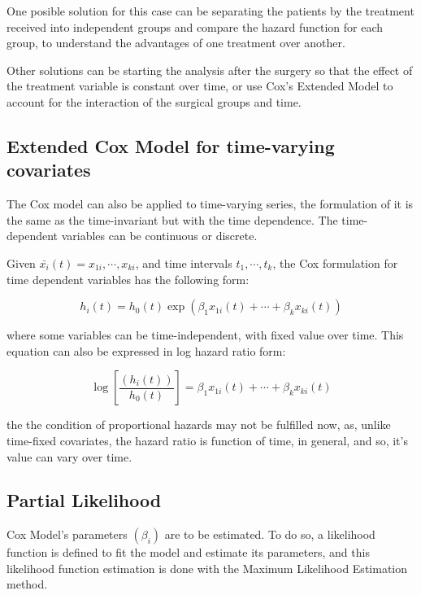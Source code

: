 \documentclass[11pt]{book} %
\begin{document}
      One posible solution for this case can be separating the patients by the treatment received into independent groups and compare the hazard function for each group, to understand the advantages of one treatment over another.

      Other solutions can be starting the analysis after the surgery so that the effect of the treatment variable is constant over time, or use Cox's Extended Model to account for the interaction of the surgical groups and time.





    \subsection{Extended Cox Model for time-varying covariates}

      The Cox model can also be applied to time-varying series, the formulation of it is the same as the time-invariant but with the time dependence. The time-dependent variables can be continuous or discrete.

      Given $\bar{x_i}(t) = x_{1i},\cdots,x_{ki}$, and time intervals $t_1,\cdots,t_k$, the Cox formulation for time dependent variables has the following form:

      \begin{equation}
        h_i(t) = h_0(t)\exp(\beta_1x_{1i}(t)+\cdots+\beta_kx_{ki}(t))
        \label{eq:cox-time-varying-hazard}
      \end{equation}

      where some variables can be time-independent, with fixed value over time. This equation can also be expressed in log hazard ratio form:

      \begin{equation}
        \log \left[ \frac{(h_i(t))}{h_0(t)} \right] = \beta_1x_{1i}(t) + \cdots + \beta_kx_{ki}(t)
        \label{eq:cox-time-varying-hazard-ratio}
      \end{equation}

      the the condition of proportional hazards may not be fulfilled now, as, unlike time-fixed covariates, the hazard ratio is function of time, in general, and so, it's value can vary over time.

    \subsection{Partial Likelihood}

      Cox Model's parameters $(\beta_i)$ are to be estimated. To do so, a likelihood function is defined to fit the model and estimate its parameters, and this likelihood function estimation is done with the Maximum Likelihood Estimation method.
\end{document}
